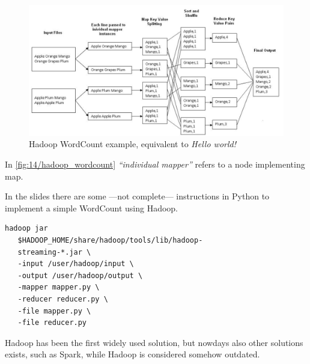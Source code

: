 \begin{figure}[htbp]
   \centering
   \includegraphics{images/14/hadoop_wordcount.png}
   \caption{Hadoop WordCount example, equivalent to \textit{Hello world!}}
   \label{fig:14/hadoop_wordcount}
\end{figure}
 In \autoref{fig:14/hadoop_wordcount} \textit{``individual mapper''} refers to a node implementing map.

In the slides there are some ---not complete--- instructions in Python to implement a simple WordCount using Hadoop.

\begin{lstlisting}[caption={Launching hadoop}]
   hadoop jar
   $HADOOP_HOME/share/hadoop/tools/lib/hadoop-
   streaming-*.jar \
   -input /user/hadoop/input \
   -output /user/hadoop/output \
   -mapper mapper.py \
   -reducer reducer.py \
   -file mapper.py \
   -file reducer.py
\end{lstlisting}

Hadoop has been the first widely used solution, but nowdays also other solutions exists, such as Spark, while Hadoop is considered somehow outdated.

